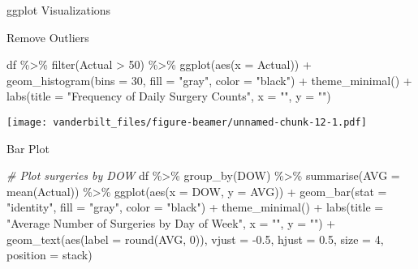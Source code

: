 \documentclass[
  ignorenonframetext,
]{beamer}
\newenvironment{Shaded}{\begin{snugshade}}{\end{snugshade}}
\newcommand{\AttributeTok}[1]{\textcolor[rgb]{0.77,0.63,0.00}{#1}}
\newcommand{\CommentTok}[1]{\textcolor[rgb]{0.56,0.35,0.01}{\textit{#1}}}
\newcommand{\DecValTok}[1]{\textcolor[rgb]{0.00,0.00,0.81}{#1}}
\newcommand{\FloatTok}[1]{\textcolor[rgb]{0.00,0.00,0.81}{#1}}
\newcommand{\FunctionTok}[1]{\textcolor[rgb]{0.00,0.00,0.00}{#1}}
\newcommand{\NormalTok}[1]{#1}
\newcommand{\SpecialCharTok}[1]{\textcolor[rgb]{0.00,0.00,0.00}{#1}}
\newcommand{\StringTok}[1]{\textcolor[rgb]{0.31,0.60,0.02}{#1}}
\begin{document}
\begin{frame}[fragile]{ggplot Visualizations}
\begin{block}{Remove Outliers}
\protect\hypertarget{remove-outliers}{}
\begin{Shaded}
\begin{Highlighting}[]
\NormalTok{df }\SpecialCharTok{\%\textgreater{}\%} 
  \FunctionTok{filter}\NormalTok{(Actual }\SpecialCharTok{\textgreater{}} \DecValTok{50}\NormalTok{) }\SpecialCharTok{\%\textgreater{}\%} 
  \FunctionTok{ggplot}\NormalTok{(}\FunctionTok{aes}\NormalTok{(}\AttributeTok{x =}\NormalTok{ Actual)) }\SpecialCharTok{+} 
  \FunctionTok{geom\_histogram}\NormalTok{(}\AttributeTok{bins =} \DecValTok{30}\NormalTok{, }\AttributeTok{fill =} \StringTok{"gray"}\NormalTok{, }\AttributeTok{color =} \StringTok{"black"}\NormalTok{) }\SpecialCharTok{+}
  \FunctionTok{theme\_minimal}\NormalTok{() }\SpecialCharTok{+}
  \FunctionTok{labs}\NormalTok{(}\AttributeTok{title =} \StringTok{"Frequency of Daily Surgery Counts"}\NormalTok{,}
       \AttributeTok{x =} \StringTok{""}\NormalTok{,}
       \AttributeTok{y =} \StringTok{""}\NormalTok{)}
\end{Highlighting}
\end{Shaded}

\texttt{[image: vanderbilt\_files/figure-beamer/unnamed-chunk-12-1.pdf]}
\end{block}

\begin{block}{Bar Plot}
\protect\hypertarget{bar-plot}{}
\begin{Shaded}
\begin{Highlighting}[]
\CommentTok{\# Plot surgeries by DOW}
\NormalTok{df }\SpecialCharTok{\%\textgreater{}\%} 
  \FunctionTok{group\_by}\NormalTok{(DOW) }\SpecialCharTok{\%\textgreater{}\%} 
  \FunctionTok{summarise}\NormalTok{(}\AttributeTok{AVG =} \FunctionTok{mean}\NormalTok{(Actual)) }\SpecialCharTok{\%\textgreater{}\%} 
  \FunctionTok{ggplot}\NormalTok{(}\FunctionTok{aes}\NormalTok{(}\AttributeTok{x =}\NormalTok{ DOW, }\AttributeTok{y =}\NormalTok{ AVG)) }\SpecialCharTok{+} 
  \FunctionTok{geom\_bar}\NormalTok{(}\AttributeTok{stat =} \StringTok{"identity"}\NormalTok{, }\AttributeTok{fill =} \StringTok{"gray"}\NormalTok{, }\AttributeTok{color =} \StringTok{"black"}\NormalTok{) }\SpecialCharTok{+} 
  \FunctionTok{theme\_minimal}\NormalTok{() }\SpecialCharTok{+} 
  \FunctionTok{labs}\NormalTok{(}\AttributeTok{title =} \StringTok{"Average Number of Surgeries by Day of Week"}\NormalTok{,}
       \AttributeTok{x =} \StringTok{""}\NormalTok{,}
       \AttributeTok{y =} \StringTok{""}\NormalTok{) }\SpecialCharTok{+} 
  \FunctionTok{geom\_text}\NormalTok{(}\FunctionTok{aes}\NormalTok{(}\AttributeTok{label =} \FunctionTok{round}\NormalTok{(AVG, }\DecValTok{0}\NormalTok{)), }\AttributeTok{vjust =} \SpecialCharTok{{-}}\FloatTok{0.5}\NormalTok{, }\AttributeTok{hjust =} \FloatTok{0.5}\NormalTok{, }\AttributeTok{size =} \DecValTok{4}\NormalTok{, }\AttributeTok{position =} \StringTok{\textquotesingle{}stack\textquotesingle{}}\NormalTok{)}
\end{Highlighting}
\end{Shaded}


\end{block}
\end{frame}
\end{document}
